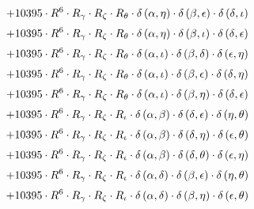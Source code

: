 \begin{subequations}
\begin{gather}
 \\[0.2em] \notag 		 + 10395 \cdot R^{6} \cdot R_{\gamma{}} \cdot R_{\zeta{}} \cdot R_{\theta{}} \cdot \delta{}\left(\alpha{}, \eta{}\right) \cdot \delta{}\left(\beta{}, \epsilon{}\right) \cdot \delta{}\left(\delta{}, \iota{}\right) 
 \\[0.2em] \notag 		 + 10395 \cdot R^{6} \cdot R_{\gamma{}} \cdot R_{\zeta{}} \cdot R_{\theta{}} \cdot \delta{}\left(\alpha{}, \eta{}\right) \cdot \delta{}\left(\beta{}, \iota{}\right) \cdot \delta{}\left(\delta{}, \epsilon{}\right) 
 \\[0.2em] \notag 		 + 10395 \cdot R^{6} \cdot R_{\gamma{}} \cdot R_{\zeta{}} \cdot R_{\theta{}} \cdot \delta{}\left(\alpha{}, \iota{}\right) \cdot \delta{}\left(\beta{}, \delta{}\right) \cdot \delta{}\left(\epsilon{}, \eta{}\right) 
 \\[0.2em] \notag 		 + 10395 \cdot R^{6} \cdot R_{\gamma{}} \cdot R_{\zeta{}} \cdot R_{\theta{}} \cdot \delta{}\left(\alpha{}, \iota{}\right) \cdot \delta{}\left(\beta{}, \epsilon{}\right) \cdot \delta{}\left(\delta{}, \eta{}\right) 
 \\[0.2em] \notag 		 + 10395 \cdot R^{6} \cdot R_{\gamma{}} \cdot R_{\zeta{}} \cdot R_{\theta{}} \cdot \delta{}\left(\alpha{}, \iota{}\right) \cdot \delta{}\left(\beta{}, \eta{}\right) \cdot \delta{}\left(\delta{}, \epsilon{}\right) 
 \\[0.2em] \notag 		 + 10395 \cdot R^{6} \cdot R_{\gamma{}} \cdot R_{\zeta{}} \cdot R_{\iota{}} \cdot \delta{}\left(\alpha{}, \beta{}\right) \cdot \delta{}\left(\delta{}, \epsilon{}\right) \cdot \delta{}\left(\eta{}, \theta{}\right) 
 \\[0.2em] \notag 		 + 10395 \cdot R^{6} \cdot R_{\gamma{}} \cdot R_{\zeta{}} \cdot R_{\iota{}} \cdot \delta{}\left(\alpha{}, \beta{}\right) \cdot \delta{}\left(\delta{}, \eta{}\right) \cdot \delta{}\left(\epsilon{}, \theta{}\right) 
 \\[0.2em] \notag 		 + 10395 \cdot R^{6} \cdot R_{\gamma{}} \cdot R_{\zeta{}} \cdot R_{\iota{}} \cdot \delta{}\left(\alpha{}, \beta{}\right) \cdot \delta{}\left(\delta{}, \theta{}\right) \cdot \delta{}\left(\epsilon{}, \eta{}\right) 
 \\[0.2em] \notag 		 + 10395 \cdot R^{6} \cdot R_{\gamma{}} \cdot R_{\zeta{}} \cdot R_{\iota{}} \cdot \delta{}\left(\alpha{}, \delta{}\right) \cdot \delta{}\left(\beta{}, \epsilon{}\right) \cdot \delta{}\left(\eta{}, \theta{}\right) 
 \\[0.2em] \notag 		 + 10395 \cdot R^{6} \cdot R_{\gamma{}} \cdot R_{\zeta{}} \cdot R_{\iota{}} \cdot \delta{}\left(\alpha{}, \delta{}\right) \cdot \delta{}\left(\beta{}, \eta{}\right) \cdot \delta{}\left(\epsilon{}, \theta{}\right) 

\end{gather}
\end{subequations}
